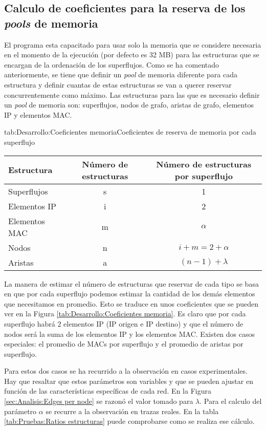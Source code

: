 \documentclass[tfg,epsbased,lof,lot,loa,covers,final,copyright,overleaf]{tfgtfmthesisuam}
\begin{document}
\subsection{Calculo de coeficientes para la reserva de los \textit{pools} de memoria}
\label{subsec:Desarrollo:IPMAC:CoefPools}
El programa esta capacitado para usar solo la memoria que se considere necesaria en el momento de la ejecución (por defecto es 32 MB) para las estructuras que se encargan de la ordenación de los superflujos. Como se ha comentado anteriormente, se tiene que definir un \textit{pool} de memoria diferente para cada estructura y definir cuantas de estas estructuras se van a querer reservar concurrentemente como máximo. Las estructuras para las que es necesario definir un \textit{pool} de memoria son: superflujos, nodos de grafo, aristas de grafo, elementos IP y elementos MAC.

\begin{table}{tab:Desarrollo:Coeficientes memoria}{Coeficientes de reserva de memoria por cada superflujo}
	\begin{tabular}{lcc}
		\toprule \textbf{Estructura} & \textbf{Número de estructuras}  & \textbf{Número de estructuras por superflujo} \\ \midrule
		Superflujos & s & 1 \\
		Elementos IP & i & 2 \\
		Elementos MAC & m & $\alpha$ \\
		Nodos & n & $i + m = 2 + \alpha$ \\
		Aristas & a & $(n - 1) + \lambda$  \\ \bottomrule
	\end{tabular}
\end{table}

La manera de estimar el número de estructuras que reservar de cada tipo se basa en que por cada superflujo podemos estimar la cantidad de los demás elementos que necesitamos en promedio. Esto se traduce en unos coeficientes que se pueden ver en la Figura \ref{tab:Desarrollo:Coeficientes memoria}. Es claro que por cada superflujo habrá 2 elementos IP (IP origen e IP destino) y que el número de nodos será la suma de los elementos IP y los elementos MAC. Existen dos casos especiales: el promedio de MACs por superflujo y el promedio de aristas por superflujo.

Para estos dos casos se ha recurrido a la observación en casos experimentales. Hay que resaltar que estos parámetros son variables y que se pueden ajustar en función de las características específicas de cada red. En la Figura \ref{sec:Analisis:Edges per node} se razonó el valor tomado para $\lambda$. Para el calculo del parámetro $\alpha$ se recurre a la observación en trazas reales. En la tabla \ref{tab:Pruebas:Ratios estructuras} puede comprobarse como se realiza ese cálculo.
\end{document}
